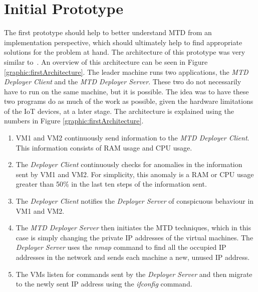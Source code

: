 \section{Initial Prototype} \label{section:initialPrototype}
The first prototype should help to better understand MTD from an implementation perspective, which should ultimately help to find appropriate solutions for the problem at hand. The architecture of this prototype was very similar to~\cite{article:Cedeno}. An overview of this architecture can be seen in Figure \ref{graphic:firstArchitecture}. The leader machine runs two applications, the \textit{MTD Deployer Client} and the \textit{MTD Deployer Server}. These two do not necessarily have to run on the same machine, but it is possible. The idea was to have these two programs do as much of the work as possible, given the hardware limitations of the IoT devices, at a later stage. The architecture is explained using the numbers in Figure \ref{graphic:firstArchitecture}.
\begin{enumerate}
    \item VM1 and VM2 continuously send information to the \textit{MTD Deployer Client}. This information consists of RAM usage and CPU usage. 
    \item The \textit{Deployer Client} continuously checks for anomalies in the information sent by VM1 and VM2. For simplicity, this anomaly is a RAM or CPU usage greater than 50\% in the last ten steps of the information sent.
    \item The \textit{Deployer Client} notifies the \textit{Deployer Server} of conspicuous behaviour in VM1 and VM2. 
    \item The \textit{MTD Deployer Server} then initiates the MTD techniques, which in this case is simply changing the private IP addresses of the virtual machines. The \textit{Deployer Server} uses the \textit{nmap} command to find all the occupied IP addresses in the network and sends each machine a new, unused IP address. 
    \item The VMs listen for commands sent by the \textit{Deployer Server} and then migrate to the newly sent IP address using the \textit{ifconfig} command. 
\end{enumerate}

